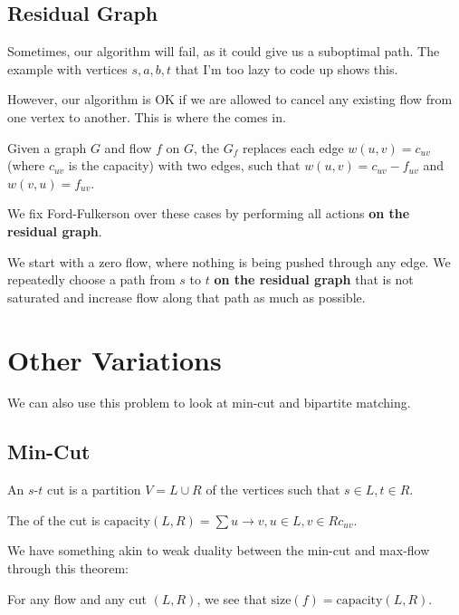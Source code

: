 \documentclass{article}
\begin{document}
\subsection{Residual Graph}
Sometimes, our algorithm will fail, as it could give us a suboptimal path. The example with vertices $s, a, b, t$ that I'm too lazy to code up shows this. 

However, our algorithm is OK if we are allowed to cancel any existing flow from one vertex to another. This is where the  comes in.

\begin{defn}
    Given a graph $G$ and flow $f$ on $G$, the  $G_f$ replaces each edge $w(u, v) = c_{uv}$ (where $c_{uv}$ is the capacity) with two edges, such that $w(u, v) = c_{uv} - f_{uv}$ and $w(v, u) = f_{uv}$. 
\end{defn}

We fix Ford-Fulkerson over these cases by performing all actions \textbf{on the residual graph}.

\begin{defn}
    We start with a zero flow, where nothing is being pushed through any edge. We repeatedly choose a path from $s$ to $t$ \textbf{on the residual graph} that is not saturated and increase flow along that path as much as possible.
\end{defn}

\section{Other Variations}
We can also use this problem to look at min-cut and bipartite matching.

\subsection{Min-Cut}

\begin{defn}[s-t cut]
    An $s$-$t$ cut is a partition $V = L \cup R$ of the vertices such that $s \in L, t \in R$. 
\end{defn}

The  of the cut is $\mathrm{capacity}(L, R) = \sum{u \to v, u \in L, v \in R}{} c_{uv}$.

We have something akin to weak duality between the min-cut and max-flow through this theorem:

\begin{theorem}
    For any flow and any cut $(L, R)$, we see that $\mathrm{size}(f) = \mathrm{capacity}(L, R)$. 
\end{theorem}
\end{document}

